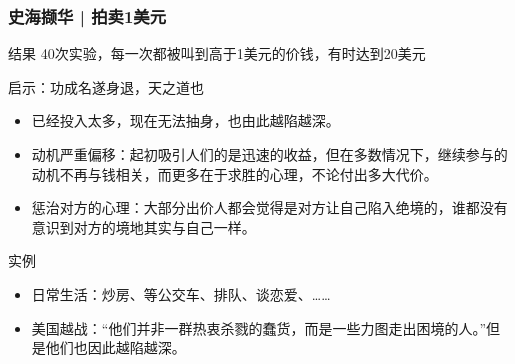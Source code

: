 \begin{frame}
  \frametitle{史海撷华 | 拍卖1美元}
  \begin{block}{结果}
    40次实验，每一次都被叫到高于1美元的价钱，有时达到20美元
  \end{block}
  \vspace{-0.5em}
  \pause
  \begin{block}{启示：\alert{功成名遂身退，天之道也}}
    \begin{itemize}
      \item 已经投入太多，现在无法抽身，也由此越陷越深。
      \item 动机严重偏移：起初吸引人们的是迅速的收益，但在多数情况下，继续参与的动机不再与钱相关，而更多在于求胜的心理，不论付出多大代价。
      \item 惩治对方的心理：大部分出价人都会觉得是对方让自己陷入绝境的，谁都没有意识到对方的境地其实与自己一样。
    \end{itemize}
  \end{block}
  \vspace{-0.5em}
  \pause
  \begin{block}{实例}
    \begin{itemize}
      \item 日常生活：炒房、等公交车、排队、谈恋爱、……
      \item 美国越战：“他们并非一群热衷杀戮的蠢货，而是一些力图走出困境的人。”但是他们也因此越陷越深。
    \end{itemize}
  \end{block}
\end{frame}

